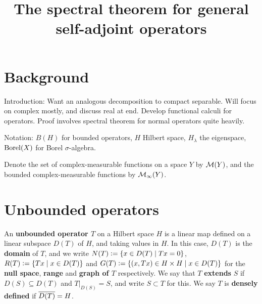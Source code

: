 \documentclass[10pt]{amsart}
\title{The spectral theorem for general self-adjoint operators}
\begin{document}
\maketitle
\section{Background}
Introduction: Want an analogous decomposition to compact separable. Will focus on complex mostly, and discuss real at end. Develop functional calculi for operators. Proof involves spectral theorem for normal operators quite heavily.

Notation: $B(H)$ for bounded operators, $H$ Hilbert space, $H_\lambda$ the eigenspace, $\operatorname{Borel}(X)$ for Borel $\sigma$-algebra. 

Denote the set of complex-measurable functions on a space $Y$ by $\mathcal{M}(Y)$, and the bounded complex-measurable functions by $\mathcal{M}_\infty(Y)$. 
\section{Unbounded operators}
An \textbf{unbounded operator $T$} on a Hilbert space $H$ is a linear map defined on a linear subspace $D(T)$ of $H$, and taking values in $H$. In this case, $D(T)$ is the \textbf{domain} of $T$, and we write $N(T) \vcentcolon= \left\{  x \in D(T) \mid Tx = 0  \right\}$, $R(T) \vcentcolon= \left\{  Tx \mid x \in D(T)  \right\}$ and $G(T) \vcentcolon= \left\{  (x, Tx) \in H \times H \mid x \in D(T)  \right\}$ for the \textbf{null space}, \textbf{range} and \textbf{graph of $T$} respectively. We say that $T$ \textbf{extends} $S$ if $D(S) \subseteq D(T)$ and $T|_{D(S)} = S$, and write $S \subset T$ for this. We say $T$ is \textbf{densely defined} if $\overline{D(T)} = H$.
\end{document}
